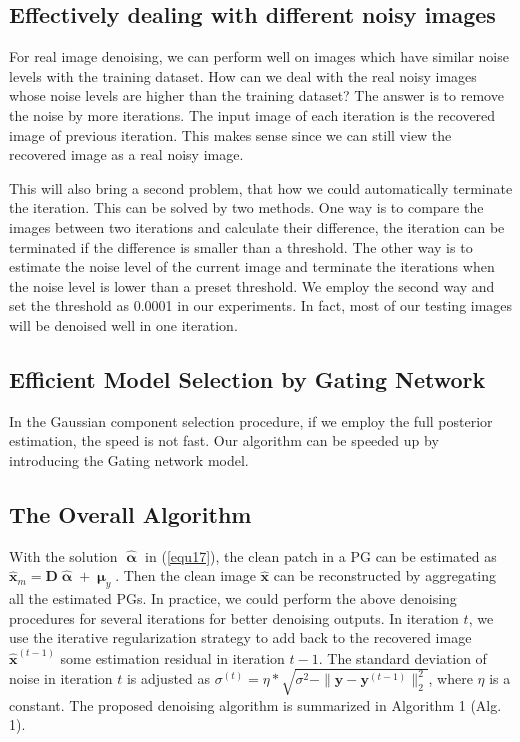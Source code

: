 \documentclass[10pt,twocolumn,letterpaper]{article}
\begin{document}
\subsection{Effectively dealing with different noisy images}
For real image denoising, we can perform well on images which have similar noise levels with the training dataset. How can we deal with the real noisy images whose noise levels are higher than the training dataset? The answer is to remove the noise by more iterations. The input image of each iteration is the recovered image of previous iteration. This makes sense since we can still view the recovered image as a real noisy image. 

This will also bring a second problem, that how we could automatically terminate the iteration. This can be solved by two methods. One way is to compare the images between two iterations and calculate their difference, the iteration can be terminated if the difference is smaller than a threshold. The other way is to estimate the noise level of the current image and terminate the iterations when the noise level is lower than a preset threshold. We employ the second way and set the threshold as 0.0001 in our experiments. In fact, most of our testing images will be denoised well in one iteration.

\subsection{Efficient Model Selection by Gating Network}
In the Gaussian component selection procedure, if we employ the full posterior estimation, the speed is not fast. Our algorithm can be speeded up by introducing the Gating network model.

\subsection{The Overall Algorithm}
With the solution $\hat{\boldsymbol{\upalpha}}$ in (\ref{equ17}), the clean patch in a PG can be estimated as $\hat{\mathbf{x}}_{m}=\mathbf{D}\hat{\boldsymbol{\upalpha}}+\boldsymbol{\upmu}_{y}$. Then the clean image $\hat{\mathbf{x}}$ can be reconstructed by aggregating all the estimated PGs. In practice, we could perform the above denoising procedures for several iterations for better denoising outputs. In iteration $t$, we use the iterative regularization strategy \cite{osher2005iterative} to add back to the recovered image $\hat{\mathbf{x}}^{(t-1)}$ some estimation residual in iteration $t-1$. The standard deviation of noise in iteration $t$ is adjusted as $\sigma^{(t)} = \eta*\sqrt{\sigma^{2}-\|\mathbf{y}-\mathbf{y}^{(t-1)}\|_{2}^{2}}$, where $\eta$ is a constant. The proposed denoising algorithm is summarized in Algorithm 1 (Alg. 1).
\end{document}
